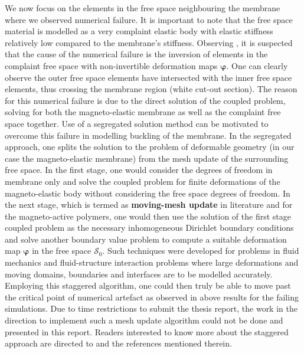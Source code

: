 We now focus on the elements in the free space neighbouring the membrane where we observed numerical failure. It is important to note that the free space material is modelled as a very complaint elastic body with elastic stiffness relatively low compared to the membrane's stiffness. Observing , it is suspected that the cause of the numerical failure is the inversion of elements in the complaint free space with non-invertible deformation maps $\bm{\varphi}$. One can clearly observe the outer free space elements have intersected with the inner free space elements, thus crossing the membrane region (white cut-out section). The reason for this numerical failure is due to the direct solution of the coupled problem, solving for both the magneto-elastic membrane as well as the complaint free space together. Use of a segregated solution method can be motivated to overcome this failure in modelling buckling of the membrane. In the segregated approach, one splits the solution to the problem of deformable geometry (in our case the magneto-elastic membrane) from the mesh update of the surrounding free space. In the first stage, one would consider the degrees of freedom in membrane only and solve the coupled problem for finite deformations of the magneto-elastic body without considering the free space degrees of freedom. In the next stage, which is termed as \textbf{moving-mesh update} in literature \cite{bustamante2011numerical} and \cite{pelteret2016} for the magneto-active polymers, one would then use the solution of the first stage coupled problem as the necessary inhomogeneous Dirichlet boundary conditions and solve another boundary value problem to compute a suitable deformation map $\bm{\varphi}$ in the free space $\mathcal{S}_0$. Such techniques were developed for problems in fluid mechanics and fluid-structure interaction problems where large deformations and moving domains, boundaries and interfaces are to be modelled accurately. Employing this staggered algorithm, one could then truly be able to move past the critical point of numerical artefact as observed in above results for the failing simulations. Due to time restrictions to submit the thesis report, the work in the direction to implement such a mesh update algorithm could not be done and presented in this report. Readers interested to know more about the staggered approach are directed to \cite[see][Sec. 7]{pelteret2016} and the references mentioned therein. \par 

